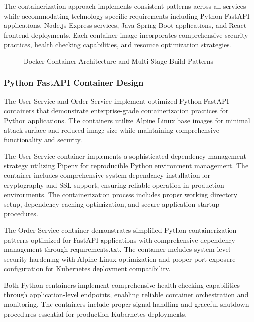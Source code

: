 The containerization approach implements consistent patterns across all services while accommodating technology-specific requirements including Python FastAPI applications, Node.js Express services, Java Spring Boot applications, and React frontend deployments. Each container image incorporates comprehensive security practices, health checking capabilities, and resource optimization strategies.

\begin{figure}[H]
\centering
\caption{Docker Container Architecture and Multi-Stage Build Patterns}
\label{fig:docker-container-architecture}
\end{figure}

\subsubsection{Python FastAPI Container Design}

The User Service and Order Service implement optimized Python FastAPI containers that demonstrate enterprise-grade containerization practices for Python applications. The containers utilize Alpine Linux base images for minimal attack surface and reduced image size while maintaining comprehensive functionality and security.

The User Service container implements a sophisticated dependency management strategy utilizing Pipenv for reproducible Python environment management. The container includes comprehensive system dependency installation for cryptography and SSL support, ensuring reliable operation in production environments. The containerization process includes proper working directory setup, dependency caching optimization, and secure application startup procedures.

The Order Service container demonstrates simplified Python containerization patterns optimized for FastAPI applications with comprehensive dependency management through requirements.txt. The container includes system-level security hardening with Alpine Linux optimization and proper port exposure configuration for Kubernetes deployment compatibility.

Both Python containers implement comprehensive health checking capabilities through application-level endpoints, enabling reliable container orchestration and monitoring. The containers include proper signal handling and graceful shutdown procedures essential for production Kubernetes deployments.

